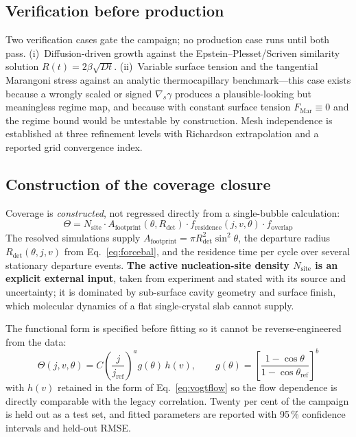 \documentclass[11pt,a4paper]{article}
\begin{document}
\subsection{Verification before production}
Two verification cases gate the campaign; no production case runs until both pass.
(i)~Diffusion-driven growth against the Epstein--Plesset/Scriven similarity solution
$R(t)=2\beta\sqrt{Dt}$. (ii)~Variable surface tension and the tangential Marangoni stress against an
analytic thermocapillary benchmark---this case exists because a wrongly scaled or signed
$\nabla_s\gamma$ produces a plausible-looking but meaningless regime map, and because with constant
surface tension $F_{\mathrm{Mar}}\equiv0$ and the regime bound would be untestable by construction.
Mesh independence is established at three refinement levels with Richardson extrapolation and a
reported grid convergence index.

\subsection{Construction of the coverage closure}\label{sec:closure}
Coverage is \emph{constructed}, not regressed directly from a single-bubble calculation:
\begin{equation}
\Theta = N_{\mathrm{site}}\cdot A_{\mathrm{footprint}}(\theta,R_{\mathrm{det}})
\cdot f_{\mathrm{residence}}(j,v,\theta)\cdot f_{\mathrm{overlap}}
\label{eq:cov}
\end{equation}
The resolved simulations supply $A_{\mathrm{footprint}}=\pi R_{\mathrm{det}}^2\sin^2\theta$, the
departure radius $R_{\mathrm{det}}(\theta,j,v)$ from Eq.~\eqref{eq:forcebal}, and the residence time
per cycle over several stationary departure events. \textbf{The active nucleation-site density
$N_{\mathrm{site}}$ is an explicit external input}, taken from experiment and stated with its source
and uncertainty; it is dominated by sub-surface cavity geometry and surface finish, which molecular
dynamics of a flat single-crystal slab cannot supply.

The functional form is specified before fitting so it cannot be reverse-engineered from the data:
\begin{equation}
\Theta(j,v,\theta) = C\left(\frac{j}{j_{\mathrm{ref}}}\right)^{a} g(\theta)\,h(v),
\qquad g(\theta)=\left[\frac{1-\cos\theta}{1-\cos\theta_{\mathrm{ref}}}\right]^{b}
\end{equation}
with $h(v)$ retained in the form of Eq.~\eqref{eq:vogtflow} so the flow dependence is directly
comparable with the legacy correlation. Twenty per cent of the campaign is held out as a test set,
and fitted parameters are reported with 95\,\% confidence intervals and held-out RMSE.
\end{document}
